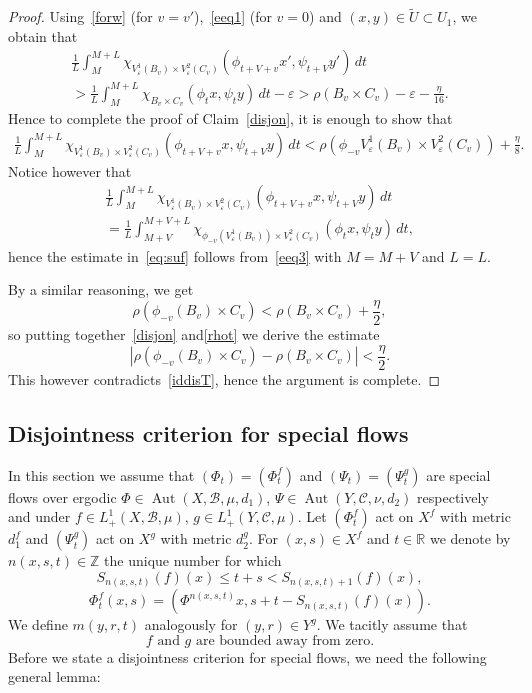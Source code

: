 \documentclass[JEP,XML,SOM,Unicode,NoEqCountersInSection]{cedram}
\let\mathcal\mathscr
\let\epsilon\varepsilon
\DeclareMathOperator{\Aut}{Aut}
\theoremstyle{definition}
\theoremstyle{plain}
\newcommand\RR{\mathbb{R}}
\newcommand\ZZ{\mathbb{Z}}
\newcommand\cB{\mathcal{B}}
\newcommand\cC{\mathcal{C}}
\newcommand{\be}{\begin{equation*}}
\newcommand{\ee}{\end{equation*}}
\begin{document}
\begin{proof}
Using~\eqref{forw} (for $v=v'$),~\eqref{eeq1} (for $v=0$) and $(x,y)\in \widetilde{U}\subset U_1$, we obtain that
\begin{multline*}
\frac{1}{L}\int_{M}^{M+L}\chi_{V^1_{\epsilon}(B_v)
\times V^2_{\epsilon}(C_v)}(\phi_{t+V+v}x',\psi_{t+V}y')\,dt \\ > \frac{1}{L}\int_{M}^{M+L}\chi_{B_v
\times C_v}(\phi_tx,\psi_ty)\,dt-\epsilon >
\rho(B_v\times C_v)-\epsilon-\frac{\eta}{16}.
\end{multline*}
Hence to complete the proof of Claim~\eqref{disjon}, it is enough to show that
\begin{multline}\label{eq:suf}
\frac{1}{L}\int_{M}^{M+L}\chi_{V^1_{\epsilon}(B_v)
\times
V^2_\epsilon(C_v)}(\phi_{t+V+v}x,\psi_{t+V}y)\,dt<
\rho(\phi_{-v}V^1_{\epsilon}(B_v)
\times V^2_\epsilon(C_v))+\frac{\eta}{8}.
\end{multline}
Notice however that
\begin{multline*}
\frac{1}{L}\int_{M}^{M+L}\chi_{V^1_{\epsilon}(B_v)
\times
V^2_\epsilon(C_v)}(\phi_{t+V+v}x,\psi_{t+V}y)\,dt \\ =\frac{1}{L}\int_{M+V}^{M+V+L}\chi_{\phi_{-v}(V^1_{\epsilon}(B_v))
\times
V^2_\epsilon(C_v)}(\phi_{t}x,\psi_{t}y)\,dt,
\end{multline*}
hence the estimate in~\eqref{eq:suf} follows from~\eqref{eeq3} with $M=M+V$ and $L=L$.

By a similar reasoning, we get
\begin{equation}\label{rhot}\rho(\phi_{-v}(B_v)\times C_v)<\rho(B_v\times C_v)+\frac{\eta}{2},
\end{equation}
so putting together~\eqref{disjon} and\eqref{rhot} we derive the estimate
\[|\rho(\phi_{-v}(B_v)\times C_v)-\rho(B_v\times C_v)|<\frac{\eta}{2}.\]
This however contradicts~\eqref{iddisT}, hence the argument is complete.
\end{proof}

\subsection{Disjointness criterion for special flows}
In this section we assume that $(\Phi_t)=(\Phi_t^f)$ and $(\Psi_t)=(\Psi_t^g)$ are special flows over ergodic $\Phi\in \Aut(X,\cB,\mu,d_1)$, $\Psi\in \Aut(Y,\cC,\nu,d_2)$ respectively and under $f\in L^1_+(X,\cB,\mu)$, $g\in L^1_+(Y,\cC,\mu)$. Let $(\Phi_t^f)$ act on $X^f$ with metric $d_1^f$ and $(\Psi_t^g)$ act on $X^g$ with metric $d_2^g$. For $(x,s)\in X^f$ and $t\in \RR$ we denote by $n(x,s,t)\in \ZZ$ the unique number for which
\[
S_{n(x,s,t)}(f)(x)\leq t+s<S_{n(x,s,t)+1}(f)(x),
\]
\ie
\be\label{do1}
\Phi^f_{t}(x,s)=(\Phi^{n(x,s,t)}x,s+t-S_{n(x,s,t)}(f)(x)).\ee
We define $m(y,r,t)$ analogously for $(y,r)\in Y^g$.
We tacitly assume that
\be\label{do2}
\mbox{$f$ and $g$ are bounded away from zero.}
\ee
Before we state a disjointness criterion for special flows, we need the following general lemma:
\end{document}
